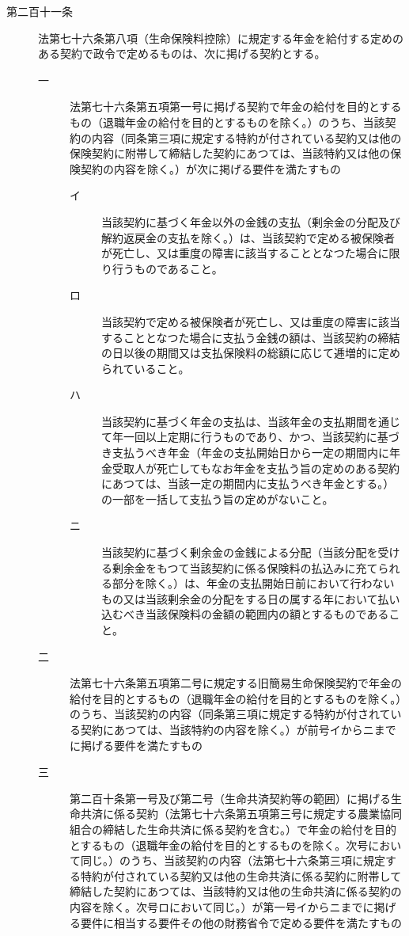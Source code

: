 \documentclass[twocolumn,a4j,10pt]{ltjtarticle}
\begin{document}
\begin{description}
\item[第二百十一条]法第七十六条第八項（生命保険料控除）に規定する年金を給付する定めのある契約で政令で定めるものは、次に掲げる契約とする。
\begin{description}
\item[一]法第七十六条第五項第一号に掲げる契約で年金の給付を目的とするもの（退職年金の給付を目的とするものを除く。）のうち、当該契約の内容（同条第三項に規定する特約が付されている契約又は他の保険契約に附帯して締結した契約にあつては、当該特約又は他の保険契約の内容を除く。）が次に掲げる要件を満たすもの
\begin{description}
\item[イ]当該契約に基づく年金以外の金銭の支払（剰余金の分配及び解約返戻金の支払を除く。）は、当該契約で定める被保険者が死亡し、又は重度の障害に該当することとなつた場合に限り行うものであること。
\item[ロ]当該契約で定める被保険者が死亡し、又は重度の障害に該当することとなつた場合に支払う金銭の額は、当該契約の締結の日以後の期間又は支払保険料の総額に応じて逓増的に定められていること。
\item[ハ]当該契約に基づく年金の支払は、当該年金の支払期間を通じて年一回以上定期に行うものであり、かつ、当該契約に基づき支払うべき年金（年金の支払開始日から一定の期間内に年金受取人が死亡してもなお年金を支払う旨の定めのある契約にあつては、当該一定の期間内に支払うべき年金とする。）の一部を一括して支払う旨の定めがないこと。
\item[ニ]当該契約に基づく剰余金の金銭による分配（当該分配を受ける剰余金をもつて当該契約に係る保険料の払込みに充てられる部分を除く。）は、年金の支払開始日前において行わないもの又は当該剰余金の分配をする日の属する年において払い込むべき当該保険料の金額の範囲内の額とするものであること。
\end{description}
\item[二]法第七十六条第五項第二号に規定する旧簡易生命保険契約で年金の給付を目的とするもの（退職年金の給付を目的とするものを除く。）のうち、当該契約の内容（同条第三項に規定する特約が付されている契約にあつては、当該特約の内容を除く。）が前号イからニまでに掲げる要件を満たすもの
\item[三]第二百十条第一号及び第二号（生命共済契約等の範囲）に掲げる生命共済に係る契約（法第七十六条第五項第三号に規定する農業協同組合の締結した生命共済に係る契約を含む。）で年金の給付を目的とするもの（退職年金の給付を目的とするものを除く。次号において同じ。）のうち、当該契約の内容（法第七十六条第三項に規定する特約が付されている契約又は他の生命共済に係る契約に附帯して締結した契約にあつては、当該特約又は他の生命共済に係る契約の内容を除く。次号ロにおいて同じ。）が第一号イからニまでに掲げる要件に相当する要件その他の財務省令で定める要件を満たすもの

\end{description}
\end{description}
\end{document}
